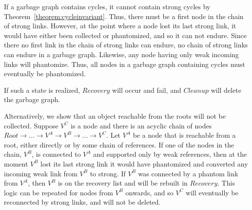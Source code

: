 \begin{proofs}
If a garbage graph contains cycles, it cannot contain strong cycles by
Theorem~\ref{theorem:cycleinvariant}. Thus, there must be a first node in the
chain of strong links. However, at the point where a node lost its last strong
link, it would have either been collected or phantomized, and so it can not
endure. Since there no first link in the chain of strong links can endure, no
chain of strong links can endure in a garbage graph. Likewise, any node having only weak incoming
links will phantomize. Thus, all nodes in a garbage graph containing cycles
must eventually be phantomized.

If such a state is realized, $Recovery$ will occur and fail, and $Cleanup$
will delete the garbage graph.

Alternatively, we show that an object reachable from the roots will not be collected.
Suppose $V^C$ is a node and there is an acyclic chain of nodes
$ Root \rightarrow ... \rightarrow V^A \rightarrow V^B \rightarrow ... \rightarrow V^C$.
Let $V^A$ be a node that is reachable from a root, either directly or by some chain of references.
If one of the nodes in the chain, $V^B$, is connected to $V^A$
and supported only by weak references, then
at the moment $V^B$ lost its last strong link it would have phantomized and converted any
incoming weak link from $V^B$ to strong. If $V^B$ was connected by a phantom link from $V^A$,
then $V^B$ is on the recovery list and will be rebuilt in $Recovery$. This logic can be
repeated for nodes from $V^B$ onwards, and so $V^C$ will eventually be reconnected by
strong links, and will not be deleted.
\label{safety}
\end{proofs}


